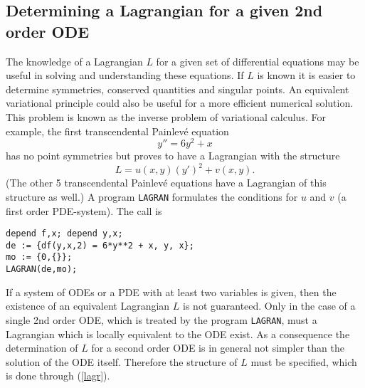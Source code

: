 \subsection{Determining a Lagrangian for a given 2nd order ODE}
The knowledge of a Lagrangian $L$ for a given set of differential
equations may be useful in solving and understanding these equations.
If $L$ is known it is easier to determine symmetries, conserved
quantities and singular points. An equivalent variational principle
could also be useful for a more efficient numerical solution.
This problem is known as the inverse problem of variational calculus.
For example, the first transcendental Painlev\'{e} equation 
\begin{equation} 
 y'' = 6y^2 + x        \label{pain}
\end{equation}
has no point symmetries but proves to have a Lagrangian with the 
structure
\begin{equation}
 L = u(x,y)(y')^2 + v(x,y).   \label{lagr}
\end{equation}
(The other 5 transcendental Painlev\'{e} equations have a Lagrangian
of this structure as well.)
A program {\tt LAGRAN} formulates the conditions for $u$ and $v$ (a first
order PDE-system). The call is
\begin{verbatim}
depend f,x; depend y,x;
de := {df(y,x,2) = 6*y**2 + x, y, x};
mo := {0,{}};
LAGRAN(de,mo);
\end{verbatim}

If a system of ODEs or a PDE with at least two variables is given,
then the existence of an equivalent Lagrangian $L$ is not guaranteed.
Only in the case of
a single 2nd order ODE, which is treated by the program {\tt LAGRAN}, 
must a Lagrangian which is locally equivalent to the ODE
exist. As a consequence the determination of $L$ for a second order
ODE is in general not simpler than the solution of the ODE itself. 
Therefore the structure of
$L$ must be specified, which is done through (\ref{lagr}).

